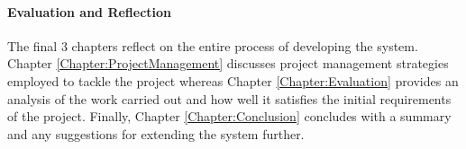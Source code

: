 \paragraph{Evaluation and Reflection}
The final 3 chapters reflect on the entire process of developing the system. Chapter \ref{Chapter:ProjectManagement} discusses project management strategies employed to tackle the project whereas Chapter \ref{Chapter:Evaluation} provides an analysis of the work carried out and how well it satisfies the initial requirements of the project. Finally, Chapter \ref{Chapter:Conclusion} concludes with a summary and any suggestions for extending the system further.
